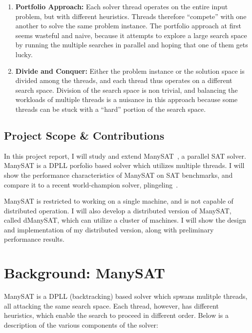 \documentclass{article}
\begin{document}
\begin{enumerate}
\item \textbf{Portfolio Approach: } Each solver thread operates on the
  entire input problem, but with different heuristics. Threads
  therefore ``compete'' with one another to solve the same problem
  instance. The portfolio approach at first seems wasteful and naive,
  because it attempts to explore a large search space by running the
  multiple searches in parallel and hoping that one of them gets
  lucky.

\item \textbf{Divide and Conquer: } Either the problem instance or the
  solution space is divided among the threads, and each thread thus
  operates on a different search space. Division of the search space
  is non trivial, and balancing the workloads of multiple threads is a
  nuisance in this approach because some threads can be stuck with a
  ``hard'' portion of the search space.
\end{enumerate}


\subsection{Project Scope \& Contributions}

In this project report, I will study and extend
ManySAT~\cite{hamadi2008manysat}, a parallel SAT solver. ManySAT is a
DPLL porfolio based solver which utilizes multiple threads. I will
show the performance characteristics of ManySAT on SAT benchmarks, and
compare it to a recent world-champion solver,
plingeling~\cite{plingeling}.


ManySAT is restricted to working on a single machine, and is not
capable of distributed operation. I will also develop a distributed
version of ManySAT, called dManySAT, which can utilize a cluster of
machines. I will show the design and implementation of my distributed
version, along with preliminary performance results.


\section{Background: ManySAT}

ManySAT is a DPLL (backtracking) based solver which spwans mulitple
threads, all attacking the same search space. Each thread, however,
has different heuristics, which enable the search to proceed in
different order. Below is a description of the various components of the solver:
\end{document}
